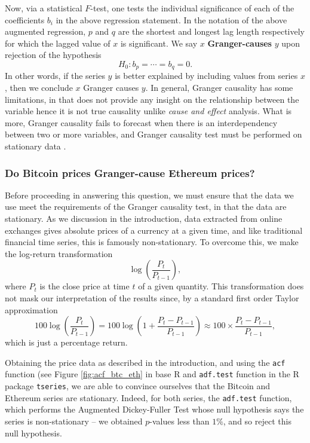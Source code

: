 \documentclass[twoside]{report}
\newcommand{\code}{\texttt}
\begin{document}
\begin{spacing}{1}
Now, via a statistical $F$-test, one tests the individual significance of each of the coefficients $b_i$ in the above regression statement. In the notation of the above augmented regression, $p$ and $q$ are the shortest and longest lag length respectively for which the lagged value of $x$ is significant. We say $x$ \textbf{Granger-causes} $y$ upon rejection of the hypothesis \[
H_0: b_p = \cdots = b_q = 0. 
\]
In other words, if the series $y$ is better explained by including values from series $x$, then we conclude $x$ Granger causes $y$. 
In general, Granger causality has some limitations, in that does not provide any insight on the relationship between the variable hence it is not true causality unlike \textit{cause and effect} analysis. What is more, Granger causality fails to forecast when there is an interdependency between two or more variables, and Granger causality test must be performed on stationary data \cite{GrangerCausality}.

\subsubsection{Do Bitcoin prices Granger-cause Ethereum prices?}
Before proceeding in answering this question, we must ensure that the data we use meet the requirements of the Granger causality test, in that the data are stationary. As we discussion in the introduction, data extracted from online exchanges gives absolute prices of a currency at a given time, and like traditional financial time series, this is famously non-stationary. To overcome this, we make the log-return transformation \[
\log\left(\frac{P_t}{P_{t-1}}\right), 
\]
where $P_t$ is the close price at time $t$ of a given quantity. This transformation does not mask our interpretation of the results since, by a standard first order Taylor approximation \[
100\log\left(\frac{P_t}{P_{t-1}}\right) = 100\log\left(1 + \frac{P_t - P_{t-1}}{P_{t-1}}\right) \approx 100 \times \frac{P_t - P_{t-1}}{P_{t-1}},
\]
which is just a percentage return.

Obtaining the price data as described in the introduction, and using the \code{acf} function (see Figure \ref{fig:acf_btc_eth} in base R and \code{adf.test} function in the R package \code{tseries}, we are able to convince ourselves that the Bitcoin and Ethereum series are stationary. Indeed, for both series, the \code{adf.test} function, which performs the Augmented Dickey-Fuller Test whose null hypothesis says the series is non-stationary \cite{adftest} -- we obtained $p$-values less than $1\%$, and so reject this null hypothesis. 


\end{spacing}
\end{document}
